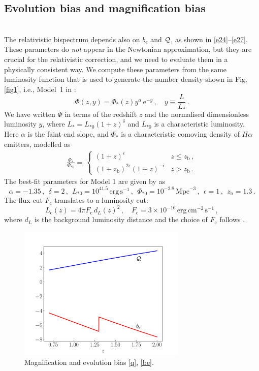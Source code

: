 \subsection{Evolution bias and magnification bias} 
~\\
The relativistic bispectrum depends  also on $b_e$  and ${\cal Q}$, as shown in \eqref{e24}--\eqref{e27}.
These parameters do {\em not} appear in the Newtonian approximation, but they are crucial for the relativistic correction, and we need to evaluate them in a physically consistent way. We compute these parameters from the same luminosity function that is  used to generate the number density shown in Fig. \ref{fig1}, i.e., Model~1 in \cite{Pozzetti:2016cch}:
\begin{equation}
\Phi( z,y) = \Phi_{*}(z) y^\alpha\,{\mathrm{e}}^{-y}\,, \quad y\equiv \frac{L}{L_{*}}\,.
\label{e12_3}
\end{equation}
We have written $\Phi$ in terms of the redshift $z$ and the normalised dimensionless luminosity $y$, where $L_*=L_{*0}(1+z)^\delta$ and $L_{*0}$ is a characteristic luminosity.   Here
 $\alpha$ is the faint-end slope, 
and $\Phi_{*}$ is a characteristic comoving density of $H\alpha$ emitters, modelled as 
\begin{align}
\frac{\Phi_{*}}{\Phi_{*0}}= \,
\begin{cases} (1+z)^{\epsilon} &   z \leq z_{\mathrm{b}}\,,\\
(1+z_{\mathrm{b}})^{2\epsilon}(1+z)^{-\epsilon} & z > z_{\mathrm{b}} \,.
\end{cases}
\end{align}
The best-fit parameters for Model 1 are given by \cite{Pozzetti:2016cch} as 
\begin{equation} \label{eucp}
\alpha=-1.35\,, ~~\delta=2\,,~~ L_{*0}=10^{41.5}\,\mathrm{erg\,s}^{-1}\,,~~\Phi_{*0}=10^{-2.8}\,\mathrm{Mpc}^{-3}\,,~~\epsilon=1\,,~~z_{\mathrm{b}}=1.3  \,. 
\end{equation}
The flux cut  
 $F_{\mathrm{c}}$
 translates to a luminosity cut:
 \begin{equation} \label{lc}
 L_{\mathrm{c}}(z)=4\pi F_{\mathrm{c}} \,d_L(z)^2\,,\quad F_{\mathrm{c}} =3\times10^{-16}\,\mathrm{erg\,cm^{-2}\,s^{-1}} \,,
 \end{equation}
where $d_L$ is the background luminosity distance and the choice of $F_{\mathrm{c}}$ follows \cite{Yankelevich:2018uaz}. 
\begin{figure}[ht]
\centering
\includegraphics[width=8.0cm]{fig/beQ-eps-converted-to}
\caption{Magnification and evolution bias \eqref{q}, \eqref{be}.} 
\label{fig2}
\end{figure}

